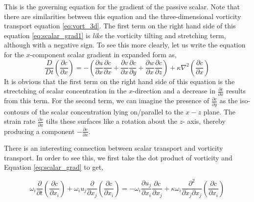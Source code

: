\documentclass{article}
\begin{document}
This is the governing equation for the gradient of the passive scalar. Note that there are similarities between this equation and the three-dimensional vorticity transport equation \eqref{eq:vort_3d}. The first term on the right hand side of this equation \eqref{eq:scalar_grad1} is \textit{like} the vorticity tilting and stretching term, although with a negative sign. To see this more clearly, let us write the equation for the $x$-component scalar gradient in expanded form as,
\begin{equation}
\frac{D}{Dt} \left( \frac{\partial c}{\partial x} \right) = -\left( \frac{\partial u}{\partial x} \frac{\partial c}{\partial x} +\frac{\partial v}{\partial x} \frac{\partial c}{\partial y} + \frac{\partial w}{\partial x} \frac{\partial c}{\partial z}\right) + \kappa \nabla ^2 \left( \frac{\partial c}{\partial x} \right)
\end{equation}
It is obvious that the first term on the right hand side of this equation is the strectching of scalar concentration in the $x$-direction and a decrease in $\frac{\partial c}{\partial x}$ results from this term. For the second term, we can imagine the presence of $\frac{\partial c}{\partial y}$ as the iso-contours of the scalar concentration lying on/parallel to the $x-z$ plane. The strain rate $\frac{\partial v}{\partial x}$ tilts these  surfaces like a rotation about the $z$- axis, thereby producing a component $-\frac{\partial c}{\partial x}$.

There is an interesting connection between scalar transport and vorticity transport. In order to see this, we first take the dot product of vorticity and Equation \eqref{eq:scalar_grad} to get,

\begin{equation}
\omega_i \frac{\partial}{\partial t} \left(\frac{\partial c}{\partial x_i}\right) + \omega_i u_j \frac{\partial }{\partial x_j}\left(\frac{\partial c}{\partial x_i}\right)= -\omega_i \frac{\partial u_j}{\partial x_i}\frac{\partial c}{\partial x_j} +\kappa \omega_i \frac{\partial^2 }{\partial x_j \partial x_j} \left(  \frac{\partial c}{\partial x_i} \right) 
\end{equation}
\end{document}

